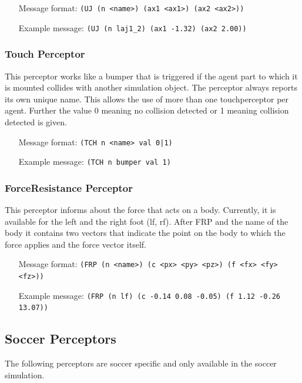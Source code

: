 \begin{itemize}
	\item[Message format:] \texttt{(UJ (n <name>) (ax1 <ax1>) (ax2 <ax2>))}
	\item[Example message:] \texttt{(UJ (n laj1\_2) (ax1 -1.32) (ax2 2.00))}
\end{itemize}

\subsubsection{Touch Perceptor}

This perceptor works like a bumper that is triggered if the agent part
to which it is mounted collides with another simulation object. The
perceptor always reports its own unique name. This allows the use of
more than one touchperceptor per agent. Further the value 0 meaning no
collision detected or 1 meaning collision detected is given.

\begin{itemize}
	\item[Message format:] \texttt{(TCH n <name> val 0|1)}
	\item[Example message:] \texttt{(TCH n bumper val 1)}
\end{itemize}


\subsubsection{ForceResistance Perceptor}
This perceptor informs about the force that acts on a body. Currently, it is
available for the left and the right foot (lf, rf).
After FRP and the name of the body it contains two vectors that indicate the
point on the body to which the force applies and the force vector itself.
\begin{itemize}
	\item[Message format:] \texttt{(FRP (n <name>) (c <px> <py> <pz>) (f <fx> <fy>
	<fz>))}
	\item[Example message:] \texttt{(FRP (n lf) (c -0.14 0.08 -0.05) (f 1.12 -0.26
	13.07))}
\end{itemize}

\subsection{Soccer Perceptors}
The following perceptors are soccer specific and only available in the soccer
simulation.

